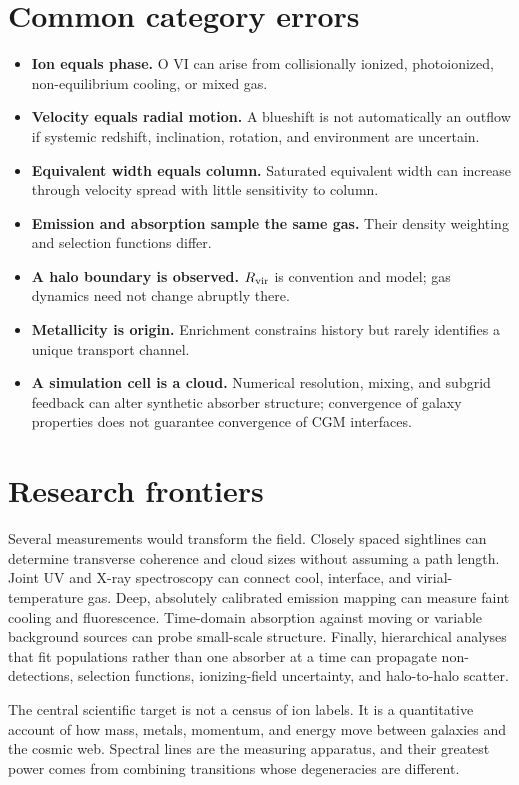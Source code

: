 \section{Common category errors}

\begin{itemize}
  \item \textbf{Ion equals phase.} O VI can arise from collisionally ionized,
  photoionized, non-equilibrium cooling, or mixed gas.
  \item \textbf{Velocity equals radial motion.} A blueshift is not
  automatically an outflow if systemic redshift, inclination, rotation, and
  environment are uncertain.
  \item \textbf{Equivalent width equals column.} Saturated equivalent width
  can increase through velocity spread with little sensitivity to column.
  \item \textbf{Emission and absorption sample the same gas.} Their density
  weighting and selection functions differ.
  \item \textbf{A halo boundary is observed.} $R_{\rm vir}$ is convention and
  model; gas dynamics need not change abruptly there.
  \item \textbf{Metallicity is origin.} Enrichment constrains history but
  rarely identifies a unique transport channel.
  \item \textbf{A simulation cell is a cloud.} Numerical resolution, mixing,
  and subgrid feedback can alter synthetic absorber structure; convergence of
  galaxy properties does not guarantee convergence of CGM interfaces.
\end{itemize}

\section{Research frontiers}

Several measurements would transform the field. Closely spaced sightlines
can determine transverse coherence and cloud sizes without assuming a path
length. Joint UV and X-ray spectroscopy can connect cool, interface, and
virial-temperature gas. Deep, absolutely calibrated emission mapping can
measure faint cooling and fluorescence. Time-domain absorption against
moving or variable background sources can probe small-scale structure.
Finally, hierarchical analyses that fit populations rather than one absorber
at a time can propagate non-detections, selection functions, ionizing-field
uncertainty, and halo-to-halo scatter.

The central scientific target is not a census of ion labels. It is a
quantitative account of how mass, metals, momentum, and energy move between
galaxies and the cosmic web. Spectral lines are the measuring apparatus, and
their greatest power comes from combining transitions whose degeneracies are
different.
